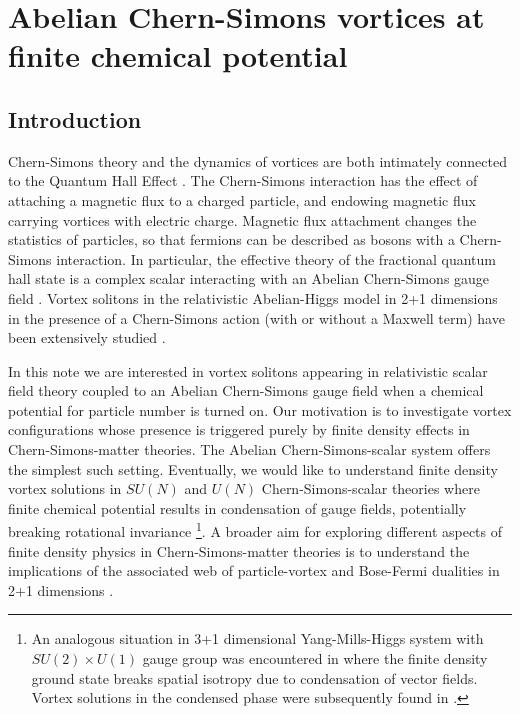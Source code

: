 \chapter{Abelian Chern-Simons vortices at finite chemical potential}
\label{ch:Chapter_2}
    \graphicspath{{Chapter_2_Folder/figures/PNG/}{Chapter_2_Folder/figures/PDF/}{Chapter_2_Folder/figures/}}


\section{Introduction}
Chern-Simons theory and the dynamics of vortices are both intimately connected to the Quantum Hall Effect \cite{PhysRevLett.62.82}. The Chern-Simons interaction  has the effect of attaching a magnetic flux to a charged particle, and endowing magnetic flux carrying vortices  with electric charge.  Magnetic flux attachment changes the  statistics of particles, so that fermions can be described as bosons with a Chern-Simons interaction. In particular, the effective theory of the fractional quantum hall state is a complex scalar interacting with an Abelian Chern-Simons gauge field \cite{PhysRevLett.62.82, 1606.06687}.
Vortex solitons in the relativistic Abelian-Higgs model  in 2+1 dimensions in the presence  of a Chern-Simons action  (with or without a Maxwell term) have been extensively studied \cite{Paul1986, Jackiw1990a, Hong1990, Jackiw1990b, hep-th/9902115, 0811.2094}.

In this note we are interested in vortex solitons appearing in  relativistic scalar field theory coupled to an Abelian Chern-Simons gauge field when a chemical potential for particle number is turned on. Our motivation is to investigate vortex configurations whose presence is triggered purely by finite density effects in Chern-Simons-matter theories. The Abelian Chern-Simons-scalar system offers the simplest  such setting. Eventually, we would like to understand finite density vortex solutions in $SU(N)$ and $U(N)$ Chern-Simons-scalar theories where  finite chemical potential results in condensation of gauge fields, potentially breaking rotational invariance \cite{Kumar:2018nkf}\footnote{An analogous situation in 3+1 dimensional Yang-Mills-Higgs system with $SU(2)\times U(1)$ gauge group was encountered in \cite{Gusynin2004} where the finite density ground state breaks spatial isotropy due to condensation of vector fields.  Vortex solutions in the condensed phase were subsequently found in \cite{hep-ph/0512203}.}.
A broader aim for exploring different aspects of finite density physics in Chern-Simons-matter theories is to understand the implications of the associated web \cite{Seiberg:2016gmd, 1606.01893, 1606.01912} of particle-vortex and Bose-Fermi dualities in 2+1 dimensions  
\cite{1110.4386, 1110.4382, Aharony:2012nh, 1211.4843, Jain:2013py, Jain:2013gza, Takimi:2013zca, 1512.00161, Geracie:2015drf}.


